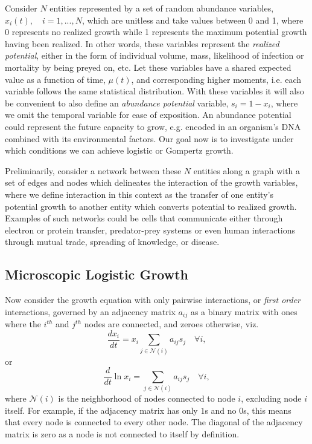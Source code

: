 \documentclass{article}
\begin{document}
Consider $N$ entities represented by a set of random abundance variables, $x_i(t), \quad i=1, ..., N$, which are unitless and take values between 0 and 1, where 0 represents no realized growth while 1 represents the maximum potential growth having been realized. In other words, these variables represent the \textit{realized potential}, either in the form of individual volume, mass, likelihood of infection or mortality by being preyed on, etc. 
Let these variables have a shared expected value as a function of time, $\mu(t)$, and corresponding higher moments, i.e. each variable follows the same statistical distribution.
With these variables it will also be convenient to also define an \textit{abundance potential} variable, $s_i = 1 - x_i$, where we omit the temporal variable for ease of exposition. An abundance potential could represent the future capacity to grow, e.g. encoded in an organism's DNA combined with its environmental factors. Our goal now is to investigate under which conditions we can achieve logistic or Gompertz growth.

Preliminarily, consider a network between these $N$ entities along a graph with a set of edges and nodes which delineates the interaction of the growth variables, where we define interaction in this context as the transfer of one entity's potential growth to another entity which converts potential to realized growth. Examples of such networks could be cells that communicate either through electron or protein transfer, predator-prey systems or even human interactions through mutual trade, spreading of knowledge, or disease.

\subsection{Microscopic Logistic Growth}

Now consider the growth equation with only pairwise interactions, or \textit{first order} interactions, governed by an adjacency matrix ${a_{ij}}$ as a binary matrix with ones where the $i^{th}$ and $j^{th}$ nodes are connected, and zeroes otherwise, viz.
\begin{equation}
\label{eq:modSIR}
\frac{d x_i}{dt} = x_i\sum_{j \in \mathcal{N}(i)}{a_{ij}}s_{j} \quad \forall i,
\end{equation}
or
\begin{equation}
\label{eq:modSIR2}
\frac{d}{dt}\ln x_i = \sum_{j \in \mathcal{N}(i)}{a_{ij}}s_{j} \quad \forall i,
\end{equation}
where $\mathcal{N}(i)$ is the neighborhood of nodes connected to node $i$, excluding node $i$ itself. For example, if the adjacency matrix has only $1$s and no $0$s, this means that every node is connected to every other node. The diagonal of the adjacency matrix is zero as a node is not connected to itself by definition.
\end{document}
